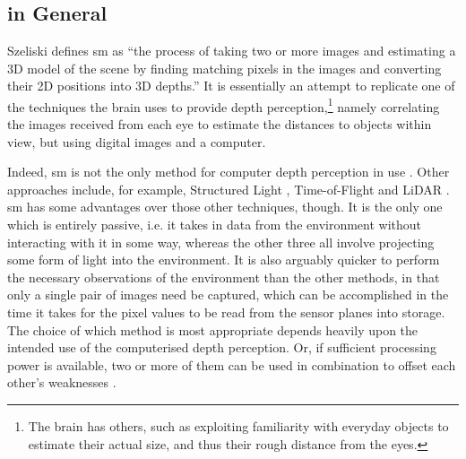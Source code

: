 \section{}



\subsection{\label{subsec:smgeneral} in General}
Szeliski defines \gls{sm} \cite[p. 469]{Szeliski2011} as ``the process of taking two or more images and estimating a 3D model of the scene by finding matching pixels in the images and converting their 2D positions into 3D depths.''  It is essentially an attempt to replicate one of the techniques the brain uses to provide depth perception,\footnote{The brain has others, such as exploiting familiarity with everyday objects to estimate their actual size, and thus their rough distance from the eyes.} namely correlating the images received from each eye to estimate the distances to objects within view, but using digital images and a computer.

Indeed, \gls{sm} is not the only method for computer depth perception in use \cite{Sinha2020}.  Other approaches include, for example, Structured Light \cite{Giancola2018}, Time-of-Flight \cite{Hansard2013} and LiDAR \cite{Dong2017}.  \Gls{sm} has some advantages over those other techniques, though.  It is the only one which is entirely passive, i.e. it takes in data from the environment without interacting with it in some way, whereas the other three all involve projecting some form of light into the environment.  It is also arguably quicker to perform the necessary observations of the environment than the other methods, in that only a single pair of images need be captured, which can be accomplished in the time it takes for the pixel values to be read from the sensor planes into storage.  The choice of which method is most appropriate depends heavily upon the intended use of the computerised depth perception.  Or, if sufficient processing power is available, two or more of them can be used in combination to offset each other's weaknesses \cite{Zanuttigh2016}.

